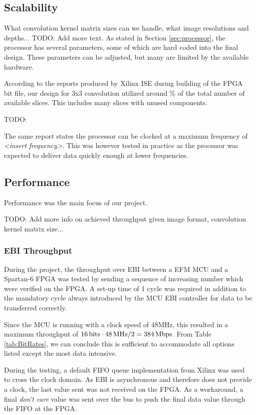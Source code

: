 \subsection{Scalability}
What convolution kernel matrix sizes can we handle, what image resolutions and depths... TODO: Add more text.
As stated in Section \ref{sec:processor}, the processor has several parameters, some of which are hard coded into the final design.
These parameters can be adjusted, but many are limited by the available hardware.

According to the reports produced by Xilinx ISE during building of the FPGA bit file, our design for 3x3 convolution utilized around \unit[16]{\%} of the total number of available slices.
This includes many slices with unused components.

TODO:

The same report states the processor can be clocked at a maximum frequency of \emph{<insert frequency>}. This was however tested in practice as the processor was expected to deliver data quickly enough at lower frequencies.

\subsection{Performance}
Performance was the main focus of our project.

TODO: Add more info on achieved throughput given image format, convolution kernel matrix size...

\subsubsection{EBI Throughput} \label{subsec:EbiThroughput}
During the project, the throughput over EBI between a EFM MCU and a Spartan-6 FPGA was tested by sending a sequence of increasing number which were verified on the FPGA.
A set-up time of 1 cycle was required in addition to the mandatory cycle always introduced by the MCU EBI controller for data to be transferred correctly.

Since the MCU is running with a clock speed of 48MHz, this resulted in a maximum throughput of $\unit[16]{bits} \cdot \unit[48]{MHz} / 2 = \unit[384]{Mbps}$.
From Table \ref{tab:BitRates}, we can conclude this is sufficient to accommodate all options listed except the most data intensive.

During the testing, a default FIFO queue implementation from Xilinx was used to cross the clock domain.
As EBI is asynchronous and therefore does not provide a clock, the last value sent was not received on the FPGA.
As a workaround, a final \textit{don't care} value was sent over the bus to push the final data value through the FIFO at the FPGA.

